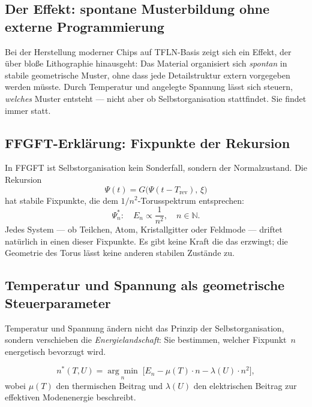 \subsection{Der Effekt: spontane Musterbildung ohne externe Programmierung}

Bei der Herstellung moderner Chips auf TFLN-Basis zeigt sich ein Effekt,
der über bloße Lithographie hinausgeht: Das Material organisiert sich
\emph{spontan} in stabile geometrische Muster, ohne dass jede Detailstruktur
extern vorgegeben werden müsste. Durch Temperatur und angelegte Spannung
lässt sich steuern, \emph{welches} Muster entsteht — nicht aber ob
Selbstorganisation stattfindet. Sie findet immer statt.

\subsection{FFGFT-Erklärung: Fixpunkte der Rekursion}

In FFGFT ist Selbstorganisation kein Sonderfall, sondern der Normalzustand.
Die Rekursion
\begin{equation}
  \Psi(t) = G\!\bigl(\Psi(t - T_{\text{rev}}),\, \xi\bigr)
\end{equation}
hat stabile Fixpunkte, die dem $1/n^2$-Torusspektrum entsprechen:
\begin{equation}
  \Psi_n^* : \quad E_n \propto \frac{1}{n^2}, \quad n \in \mathbb{N}.
\end{equation}
Jedes System — ob Teilchen, Atom, Kristallgitter oder Feldmode —
driftet natürlich in einen dieser Fixpunkte. Es gibt keine Kraft die
das erzwingt; die Geometrie des Torus lässt keine anderen stabilen
Zustände zu.

\subsection{Temperatur und Spannung als geometrische Steuerparameter}

Temperatur und Spannung ändern nicht das Prinzip der Selbstorganisation,
sondern verschieben die \emph{Energielandschaft}: Sie bestimmen, welcher
Fixpunkt~$n$ energetisch bevorzugt wird.

\begin{equation}
  n^*(T, U) = \underset{n}{\arg\min}\;
    \bigl[ E_n - \mu(T)\cdot n - \lambda(U)\cdot n^2 \bigr],
\end{equation}
wobei $\mu(T)$ den thermischen Beitrag und $\lambda(U)$ den elektrischen
Beitrag zur effektiven Modenenergie beschreibt.


